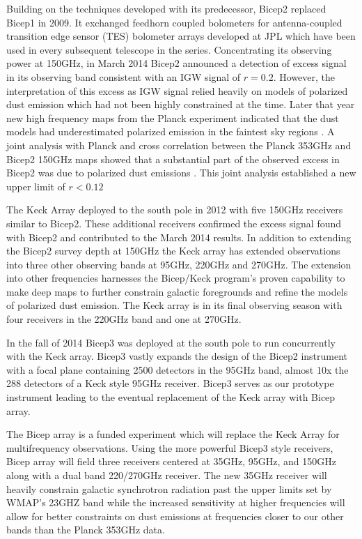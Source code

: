 \documentclass[12pt]{article}
\begin{document}
Building on the techniques developed with its predecessor, Bicep2 replaced
Bicep1 in 2009. It exchanged feedhorn coupled bolometers for antenna-coupled
transition edge sensor (TES) bolometer arrays developed at JPL which have been
used in every subsequent telescope in the series. Concentrating its observing
power at 150GHz, in March 2014 Bicep2 announced a detection of excess signal
in its observing band consistent with an IGW signal of $r=0.2$\cite{cite:BK1}.
However, the interpretation of this excess as IGW signal relied heavily on
models of polarized dust emission which had not been highly constrained at the
time. Later that year new high frequency maps from the Planck experiment
indicated that the dust models had underestimated polarized emission in the
faintest sky regions \cite{cite:PlanckXIX}. A joint analysis with Planck and
cross correlation between the Planck 353GHz and Bicep2 150GHz maps showed that
a substantial part of the observed excess in Bicep2 was due to polarized dust
emissions \cite{cite:BKP}. This joint analysis established a new upper limit
of $r<0.12$

The Keck Array deployed to the south pole in 2012 with five 150GHz receivers
similar to Bicep2. These additional receivers confirmed the excess signal
found with Bicep2 and contributed to the March 2014 results. In addition to
extending the Bicep2 survey depth at 150GHz the Keck array has extended
observations into three other observing bands at 95GHz, 220GHz and 270GHz. The
extension into other frequencies harnesses the Bicep/Keck program's proven
capability to make deep maps to further constrain galactic foregrounds and
refine the models of polarized dust emission. The Keck array is in its final
observing season with four receivers in the 220GHz band and one at 270GHz.

In the fall of 2014 Bicep3 was deployed at the south pole to run concurrently
with the Keck array. Bicep3 vastly expands the design of the Bicep2 instrument with a
focal plane containing 2500 detectors in the 95GHz band, almost 10x the 288
detectors of a Keck style 95GHz receiver. Bicep3 serves as our prototype
instrument leading to the eventual replacement of the Keck array with Bicep
array.

The Bicep array is a funded experiment which will replace the Keck Array for
multifrequency observations. Using the more powerful Bicep3 style receivers,
Bicep array will field three receivers centered at 35GHz, 95GHz, and 150GHz
along with a dual band 220/270GHz receiver. The new 35GHz receiver will
heavily constrain galactic synchrotron radiation past the upper limits set by
WMAP's 23GHZ band while the increased sensitivity at higher frequencies will
allow for better constraints on dust emissions at frequencies closer to our
other bands than the Planck 353GHz data.
\end{document}
